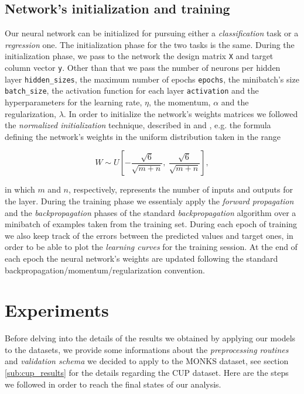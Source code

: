 \documentclass[11pt,twoside]{article}
\begin{document}
        \subsection{Network's initialization and training} %
        \label{sub:the_training_algorithm}
        Our neural network can be initialized for pursuing either a \textit{classification} task or a
        \textit{regression} one. The initialization phase for the two tasks is the same.
        During the initialization phase, we pass to the network the design matrix \texttt{X} and target column
        vector \texttt{y}. Other than that we pass the number of neurons per hidden layer
        \texttt{hidden\_sizes}, the maximum number of epochs \texttt{epochs}, the minibatch's size
        \texttt{batch\_size}, the activation function for each layer \texttt{activation} and the hyperparameters
        for the learning rate, \texttt{$\eta$}, the momentum, \texttt{$\alpha$} and the regularization,
        \texttt{$\lambda$}. In order to initialize the network's weights matrices we followed the
        \textit{normalized initialization} technique, described in \cite{deep_learning} and
        \cite{initialization}, e.g. the formula defining the network's weights in the uniform distribution
        taken in the range

        \begin{equation*}
             W \sim U \left [ - \frac{\sqrt{6}}{\sqrt{m + n}}, \ \frac{\sqrt{6}}{\sqrt{m + n}}  \right ],
        \end{equation*}

        in which $m$ and $n$, respectively, represents the number of inputs and outputs for the layer.
        During the training phase we essentialy apply the \textit{forward propagation} and the
        \textit{backpropagation} phases of the standard \textit{backpropagation} algorithm over a minibatch of
        examples taken from the training set. During each epoch of training we also keep track of the errors
        between the predicted values and target ones, in order to be able to plot the \textit{learning curves}
        for the training session. At the end of each epoch the neural network's weights are updated following
        the standard backpropagation/momentum/regularization convention.


\section{Experiments} %
\label{sec:experiments}
    Before delving into the details of the results we obtained by applying our models to the datasets, we
    provide some informations about the \textit{preprocessing routines} and \textit{validation schema} we
    decided to apply to the MONKS dataset, see section \ref{sub:cup_results} for the details regarding the
    CUP dataset. Here are the steps we followed in order to reach the final states of our analysis.
\end{document}
